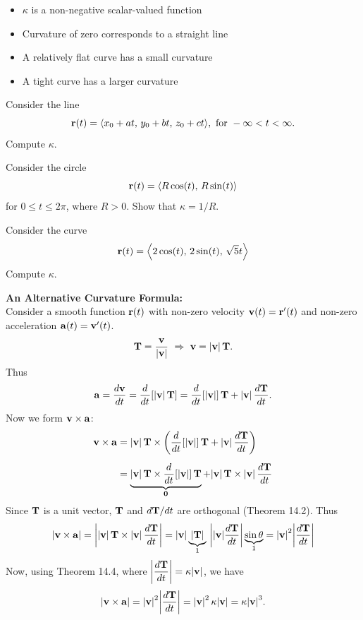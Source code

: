 \documentclass[mathNotesPreamble]{subfiles}
\begin{document}
  \begin{itemize}
    \item 
      $\kappa$ is a non-negative scalar-valued function
    \item 
      Curvature of zero corresponds to a straight line
    \item 
      A relatively flat curve has a small curvature
    \item 
      A tight curve has a larger curvature
  \end{itemize}

  \begin{ex*}
    Consider the line
      \[{\mathbf{r}}(t)={\left\langle x_0+at,\,y_0+bt,\,z_0+ct \right\rangle},\textnormal{ for }-\infty<t<\infty.\]
    Compute $\kappa$.
  \end{ex*}

  \pagebreak

  \begin{ex*}
    Consider the circle
      \[{\mathbf{r}}(t)={\left\langle R\cos(t),\,R\sin(t) \right\rangle}\]
    for $0\leq t\leq 2\pi$, where $R>0$. Show that $\kappa=1/R$.
  \end{ex*}

  \begin{ex*}
    Consider the curve
      \[{\mathbf{r}}(t)={\left\langle 2\cos(t),\,2\sin(t),\,\sqrt{5}t \right\rangle}\]
    Compute $\kappa$.
  \end{ex*}

  \pagebreak
  \textbf{An Alternative Curvature Formula:}\\
  Consider a smooth function ${\mathbf{r}}(t)$ with non-zero velocity ${\mathbf{v}}(t)={\mathbf{r}}'(t)$ and non-zero acceleration ${\mathbf{a}}(t)={\mathbf{v}}'(t)$. 
    \[\vecT=\frac{\vecv}{\abs{\vecv}}\ \Rightarrow\   \vecv=\abs{\vecv}\,\vecT.\]
  Thus
    \[{\mathbf{a}}=\frac{d{\mathbf{v}}}{dt}={\frac{d^{}}{dt^{}}}{\left[{\left\vert{\mathbf{v}}\right\vert}\,{\mathbf{T}}\right]}={\frac{d^{}}{dt^{}}}{\left[{\left\vert{\mathbf{v}}\right\vert}\right]}\,{\mathbf{T}}+{\left\vert{\mathbf{v}}\right\vert}\,\frac{d{\mathbf{T}}}{dt}.\]
  Now we form ${\mathbf{v}}\times{\mathbf{a}}$:
  \begin{align*}
    {\mathbf{v}}\times{\mathbf{a}}&={\left\vert{\mathbf{v}}\right\vert}\,{\mathbf{T}}\times{\left({\frac{d^{}}{dt^{}}}{\left[{\left\vert{\mathbf{v}}\right\vert}\right]}\,{\mathbf{T}}+{\left\vert{\mathbf{v}}\right\vert}\,\frac{d{\mathbf{T}}}{dt}\right)}\\[5pt]
      &=\underbrace{{\left\vert{\mathbf{v}}\right\vert}\,{\mathbf{T}}\times{\frac{d^{}}{dt^{}}}{\left[{\left\vert{\mathbf{v}}\right\vert}\right]}\,{\mathbf{T}}}_{\mathbf{0}}+{\left\vert{\mathbf{v}}\right\vert}\,{\mathbf{T}}\times{\left\vert{\mathbf{v}}\right\vert}\,\frac{d{\mathbf{T}}}{dt}
  \end{align*}
  Since ${\mathbf{T}}$ is a unit vector, ${\mathbf{T}}$ and $d{\mathbf{T}}/dt$ are orthogonal (Theorem 14.2). Thus
  \begin{align*}
    {\left\vert{\mathbf{v}}\times{\mathbf{a}}\right\vert}={\left\vert{\left\vert{\mathbf{v}}\right\vert}\,{\mathbf{T}}\times{\left\vert{\mathbf{v}}\right\vert}\,\frac{d{\mathbf{T}}}{dt}\right\vert}={\left\vert{\mathbf{v}}\right\vert}\underbrace{{\left\vert{\mathbf{T}}\right\vert}}_1\,{\left\vert{\left\vert{\mathbf{v}}\right\vert}\frac{d{\mathbf{T}}}{dt}\right\vert}\underbrace{\sin\theta}_1
      ={\left\vert{\mathbf{v}}\right\vert}^2 {\left\vert\frac{d{\mathbf{T}}}{dt}\right\vert}
  \end{align*}
  Now, using Theorem 14.4, where $\displaystyle{\left\vert\frac{d{\mathbf{T}}}{dt}\right\vert}=\kappa {\left\vert{\mathbf{v}}\right\vert}$, we have
    \[{\left\vert{\mathbf{v}}\times{\mathbf{a}}\right\vert}={\left\vert{\mathbf{v}}\right\vert}^2{\left\vert\frac{d{\mathbf{T}}}{dt}\right\vert}={\left\vert{\mathbf{v}}\right\vert}^2\,\kappa{\left\vert{\mathbf{v}}\right\vert}=\kappa{\left\vert{\mathbf{v}}\right\vert}^3.\]
\end{document}
